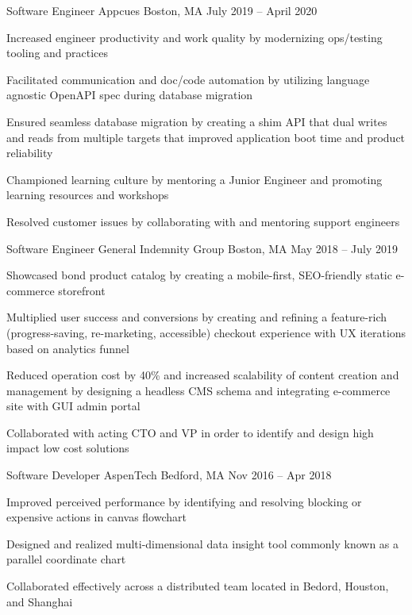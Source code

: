 \documentclass[]{awesome-cv}
\begin{document}
\begin{cventries}
	\cventry
	{Software Engineer}
	{Appcues}
	{Boston, MA}
	{July 2019 – April 2020}
	{\begin{cvitems}
		\item {Increased engineer productivity and work quality by modernizing ops/testing tooling and practices}
		\item {Facilitated communication and doc/code automation by utilizing language agnostic OpenAPI spec during database migration}
		\item {Ensured seamless database migration by creating a shim API that dual writes and reads from multiple targets that improved application boot time and product reliability}
		\item {Championed learning culture by mentoring a Junior Engineer and promoting learning resources and workshops}
		\item {Resolved customer issues by collaborating with and mentoring support engineers}
		\end{cvitems}}
	\cventry
	{Software Engineer}
	{General Indemnity Group}
	{Boston, MA}
	{May 2018 – July 2019}
	{\begin{cvitems}
		\item {Showcased bond product catalog by creating a mobile-first, SEO-friendly static e-commerce storefront}
		\item {Multiplied user success and conversions by creating and refining a feature-rich (progress-saving, re-marketing, accessible) checkout experience with UX iterations based on analytics funnel}
		\item {Reduced operation cost by 40\% and increased scalability of content creation and management by designing a headless CMS schema and integrating e-commerce site with GUI admin portal}
		\item {Collaborated with acting CTO and VP in order to identify and design high impact low cost solutions}
		\end{cvitems}}
	\cventry
	{Software Developer}
	{AspenTech}
	{Bedford, MA}
	{Nov 2016 – Apr 2018}
	{\begin{cvitems}
		\item {Improved perceived performance by identifying and resolving blocking or expensive actions in canvas flowchart}
		\item {Designed and realized multi-dimensional data insight tool commonly known as a parallel coordinate chart}
		\item {Collaborated effectively across a distributed team located in Bedord, Houston, and Shanghai}
		\end{cvitems}}
	\vspace{-5mm}
\end{cventries}
\end{document}

